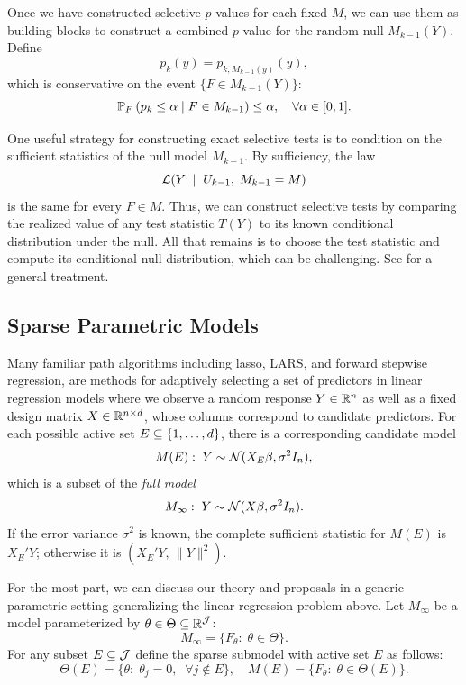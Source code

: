 \documentclass{article}
\begin{document}
Once we have constructed selective $p$-values for each fixed $M$, we can use them as building blocks to construct a combined $p$-value for the random null $M_{k-1}(Y)$. Define
\[
p_k(y) = p_{k, M_{k-1}(y)}(y),
\]
which is conservative on the event $\{F \in M_{k-1}(Y)\}$:
\begin{equation}\label{eq:selectiveGuaranteePk}
\P_F\left(p_k \leq \alpha \mid F\in M_{k-1}\right) \leq \alpha, \quad \forall \alpha \in [0,1].
\end{equation}

One useful strategy for constructing exact selective tests is to condition on the sufficient statistics of the null model $M_{k-1}$. By sufficiency, the law
\[
\L(Y \;\mid\; U_{k-1}, \; M_{k-1}=M)
\]
is the same for every $F\in M$. Thus, we can construct selective tests by comparing the realized value of any test statistic $T(Y)$ to its known conditional distribution under the null. All that remains is to choose the test statistic and compute its conditional null distribution, which can be challenging. See \citet{fithian2014optimal} for a general treatment.

\subsection{Sparse Parametric Models}\label{sec:genSparse}

Many familiar path algorithms including lasso, LARS, and forward stepwise regression, are methods for adaptively selecting a set of predictors in linear regression models where we observe a random response $Y\in \R^n$ as well as a fixed design matrix $X\in \R^{n \times d}$, whose columns correspond to candidate predictors. For each possible active set $E \sub \{1,\ldots,d\}$, there is a corresponding candidate model
\[
M(E):\; Y \sim \cN( X_E\beta, \sigma^2 I_n),
\]
which is a subset of the {\em full model}
\[
M_\infty:\; Y \sim \cN(X\beta, \sigma^2I_n).
\]
If the error variance $\sigma^2$ is known, the complete sufficient statistic for $M(E)$ is $X_E'Y$; otherwise it is $\left(X_E'Y,\, \|Y\|^2\right)$.

For the most part, we can discuss our theory and proposals in a generic parametric setting generalizing the linear regression problem above. Let $M_\infty$ be a model parameterized by $\theta\in \Theta \sub \R^{\cJ}$:
\[
M_\infty = \{F_\theta:\; \theta \in \Theta\}.
\]
For any subset $E\sub \cJ$ define the sparse submodel with active set $E$ as follows:
\[
\Theta(E) = \{\theta:\; \theta_j = 0, \;\;\forall j \notin E\}, 
\quad M(E) = \{F_\theta:\; \theta\in \Theta(E)\}.
\]
\end{document}
